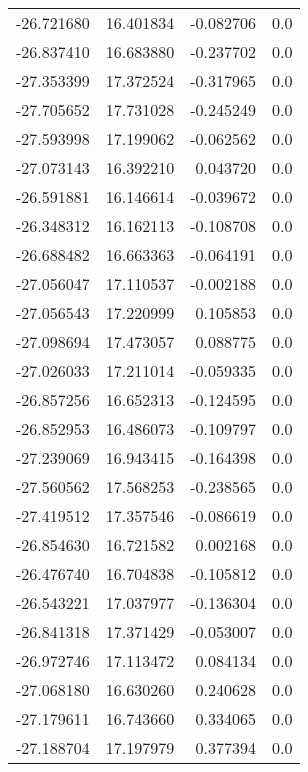 \begin{tabular}{rrrr}
      -26.721680 &        16.401834 &   -0.082706 &   0.0 \\
      -26.837410 &        16.683880 &   -0.237702 &   0.0 \\
      -27.353399 &        17.372524 &   -0.317965 &   0.0 \\
      -27.705652 &        17.731028 &   -0.245249 &   0.0 \\
      -27.593998 &        17.199062 &   -0.062562 &   0.0 \\
      -27.073143 &        16.392210 &    0.043720 &   0.0 \\
      -26.591881 &        16.146614 &   -0.039672 &   0.0 \\
      -26.348312 &        16.162113 &   -0.108708 &   0.0 \\
      -26.688482 &        16.663363 &   -0.064191 &   0.0 \\
      -27.056047 &        17.110537 &   -0.002188 &   0.0 \\
      -27.056543 &        17.220999 &    0.105853 &   0.0 \\
      -27.098694 &        17.473057 &    0.088775 &   0.0 \\
      -27.026033 &        17.211014 &   -0.059335 &   0.0 \\
      -26.857256 &        16.652313 &   -0.124595 &   0.0 \\
      -26.852953 &        16.486073 &   -0.109797 &   0.0 \\
      -27.239069 &        16.943415 &   -0.164398 &   0.0 \\
      -27.560562 &        17.568253 &   -0.238565 &   0.0 \\
      -27.419512 &        17.357546 &   -0.086619 &   0.0 \\
      -26.854630 &        16.721582 &    0.002168 &   0.0 \\
      -26.476740 &        16.704838 &   -0.105812 &   0.0 \\
      -26.543221 &        17.037977 &   -0.136304 &   0.0 \\
      -26.841318 &        17.371429 &   -0.053007 &   0.0 \\
      -26.972746 &        17.113472 &    0.084134 &   0.0 \\
      -27.068180 &        16.630260 &    0.240628 &   0.0 \\
      -27.179611 &        16.743660 &    0.334065 &   0.0 \\
      -27.188704 &        17.197979 &    0.377394 &   0.0 \\

\end{tabular}
